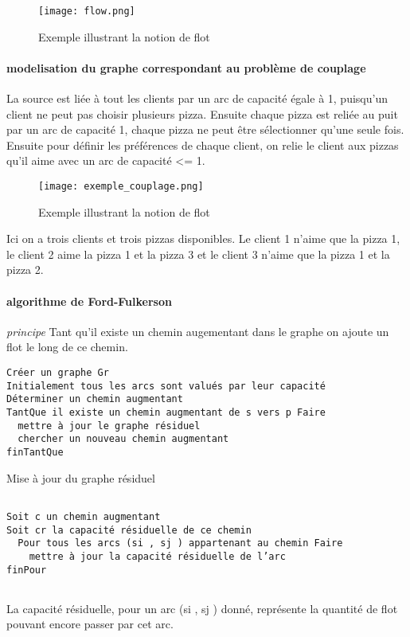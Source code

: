 \begin{figure}[h]
\begin{center}
    \texttt{[image: flow.png]} 
    \caption{Exemple illustrant la notion de flot}

\end{center}
\end{figure}

      \paragraph{modelisation du graphe correspondant au problème de couplage}
      La source est liée à tout les clients par un arc de capacité égale à 1, puisqu'un client ne peut pas choisir plusieurs pizza.
      Ensuite chaque pizza est reliée au puit par un arc de capacité 1, chaque pizza ne peut être sélectionner qu'une seule fois.
      Ensuite pour définir les préférences de chaque client, on relie le client aux pizzas qu'il aime avec un arc de capacité <= 1.

\begin{figure}[h]
\begin{center}
    \texttt{[image: exemple\_couplage.png]}
    \caption{Exemple illustrant la notion de flot}

\end{center}
\end{figure}

Ici on a trois clients et trois pizzas disponibles. Le client 1 n'aime que la pizza 1, le client 2 aime la pizza 1 et la pizza 3 et le client 3 n'aime que la pizza 1 et la pizza 2.


\paragraph{algorithme de Ford-Fulkerson}


\emph{principe} Tant qu'il existe un chemin augementant dans le graphe on ajoute un flot le long de ce chemin.

\begin{verbatim}
Créer un graphe Gr
Initialement tous les arcs sont valués par leur capacité
Déterminer un chemin augmentant
TantQue il existe un chemin augmentant de s vers p Faire
  mettre à jour le graphe résiduel
  chercher un nouveau chemin augmentant
finTantQue

\end{verbatim}

Mise à jour du graphe résiduel
\begin{verbatim}

Soit c un chemin augmentant
Soit cr la capacité résiduelle de ce chemin
  Pour tous les arcs (si , sj ) appartenant au chemin Faire
    mettre à jour la capacité résiduelle de l’arc
finPour
 
\end{verbatim}
La capacité résiduelle, pour un arc (si , sj ) donné, représente la quantité de flot pouvant encore passer par cet arc.





